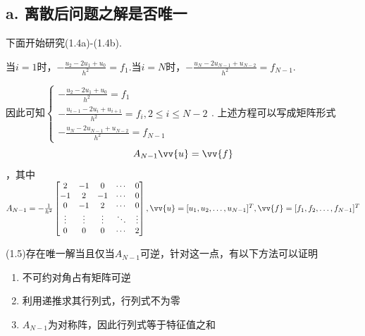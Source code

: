 \subsection*{a. 离散后问题之解是否唯一}
下面开始研究(1.4a)-(1.4b).\par
当$i=1$时，$-\frac{u_2-2u_1+u_0}{h^2}=f_1$.当$i=N$时，$-\frac{u_{N}-2u_{N-1}+u_{N-2}}{h^2}=f_{N-1}$.\par
因此可知$\begin{cases}
    -\frac{u_2-2u_1+u_0}{h^2}=f_1\\
    -\frac{u_{i-1}-2u_i+u_{i+1}}{h^2}=f_i,2\leq i\leq N-2\\
    -\frac{u_{N}-2u_{N-1}+u_{N-2}}{h^2}=f_{N-1}
\end{cases}$.
上述方程可以写成矩阵形式
\begin{equation}
A_{N-1}\vv{u}=\vv{f}
\end{equation}
，其中$A_{N-1}=-\frac{1}{h^2}\begin{bmatrix}
    2 & -1 & 0 & \cdots & 0 \\
    -1 & 2 & -1 & \cdots & 0 \\
    0 & -1 & 2 & \cdots & 0 \\
    \vdots & \vdots & \vdots & \ddots & \vdots \\
    0 & 0 & 0 & \cdots & 2
\end{bmatrix},\vv{u}=[u_1,u_2,\ldots,u_{N-1}]^T,\vv{f}=[f_1,f_2,\ldots,f_{N-1}]^T$\par
(1.5)存在唯一解当且仅当$A_{N-1}$可逆，针对这一点，有以下方法可以证明
\begin{enumerate}
    \item 不可约对角占有矩阵可逆
    \item 利用递推求其行列式，行列式不为零
    \item $A_{N-1}$为对称阵，因此行列式等于特征值之和
\end{enumerate}

